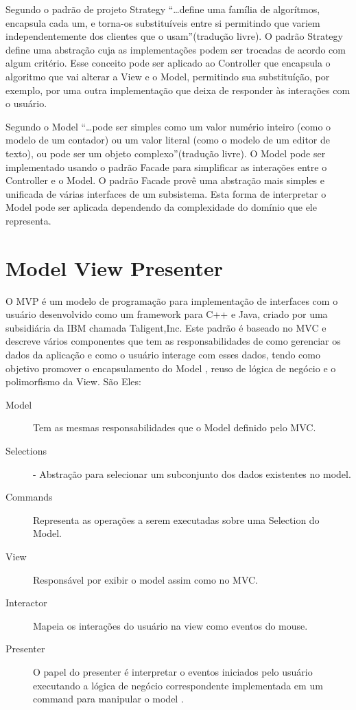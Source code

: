 Segundo  o padrão de projeto Strategy ``\ldots define uma
família de algorítmos, encapsula cada um, e torna-os substituíveis entre si
permitindo que variem independentemente dos clientes que o usam''(tradução
livre). O padrão Strategy define uma abstração cuja as implementações podem ser
trocadas de acordo com algum critério. Esse conceito pode ser aplicado ao
Controller que encapsula o algoritmo que vai alterar a View e o Model,
permitindo sua substituíção, por exemplo, por uma outra implementação que deixa
de responder às interações com o usuário.

Segundo  o Model ``\ldots pode ser simples como
um valor numério inteiro (como o modelo de um contador) ou um valor literal
(como o modelo de um editor de texto), ou pode ser um objeto complexo''(tradução
livre). O Model pode ser implementado usando o padrão Facade para simplificar
as interações entre o Controller e o Model. O padrão Facade provê
uma abstração mais simples e unificada de várias interfaces de um
subsistema\cite{gof}. Esta forma de interpretar o Model pode ser aplicada
dependendo da complexidade do domínio que ele representa.

\section{Model View Presenter}

O MVP é um modelo de programação para implementação de interfaces com o usuário
desenvolvido como um framework para C++ e Java, criado por uma subsidiária da
IBM chamada Taligent,Inc. Este padrão é baseado no MVC e descreve vários
componentes que tem as responsabilidades de como gerenciar os dados da aplicação
e como o usuário interage com esses dados, tendo como objetivo promover o
encapsulamento do Model , reuso de lógica de negócio e o polimorfismo da View.
São Eles:

\begin{description}
  \item[Model] Tem as mesmas responsabilidades que o Model definido pelo MVC.
  \item[Selections] - Abstração para selecionar um subconjunto dos dados
  existentes no model.
  \item [Commands] Representa as operações a serem executadas sobre uma
  Selection do Model.
  \item [View] Responsável por exibir o model assim como no MVC.
  \item [Interactor] Mapeia os interações do usuário na view como eventos do
  mouse.
  \item [Presenter] O papel do presenter é interpretar o eventos iniciados pelo
  usuário executando a lógica de negócio correspondente implementada em um
  command para manipular o model \cite{Potel96mvp}.
\end{description}


